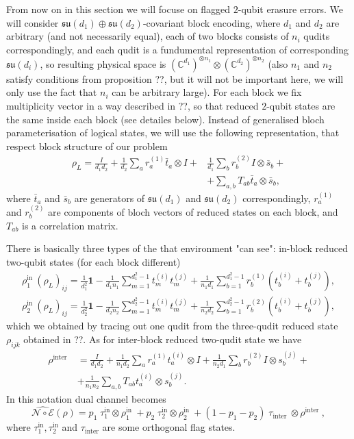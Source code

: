 \documentclass[twocolumn,superscriptaddress,aps,showpacs,amsmath,amstex,amssymb,citeautoscript,floatfix,pra,preprintnumbers]{revtex4-2}
\theoremstyle{plain}
\theoremstyle{plain}
\theoremstyle{plain}
\theoremstyle{plain}
\theoremstyle{plain}
\theoremstyle{plain}
\begin{document}
From now on in this section we will focuse on flagged $2$-qubit erasure errors. We will consider $\mathfrak{su}(d_1)\oplus\mathfrak{su}(d_2)$-covariant
block encoding, where $d_1$ and $d_2$ are arbitrary (and not necessarily equal), each of two blocks consists of $n_i$ qudits correspondingly, and
each qudit is a fundumental representation of corresponding $\mathfrak{su}(d_i)$, so resulting physical space is $(\mathbb{C}^{d_1})^{\otimes n_1}\otimes (\mathbb{C}^{d_2})^{\otimes n_2}$ (also $n_1$ and $n_2$
satisfy conditions from proposition ??, but it will not be important here, we will only use the fact that $n_i$ can be arbitrary large). 
For each block we fix multiplicity vector in a way described in ??, so that reduced $2$-qubit states are the same inside each block (see detailes below).
Instead of generalised bloch parameterisation of logical states, we will use the following representation, that respect block structure of our problem
\[
\begin{aligned}
    \rho_L=\frac{I}{d_1 d_2}+\frac{1}{d_2} \sum_a r_a^{(1)} \bar{t}_a \otimes I+&\frac{1}{d_1} \sum_b r_b^{(2)} I \otimes \bar{s}_b+\\&+\sum_{a, b} T_{a b} \bar{t}_a \otimes \bar{s}_b,
\end{aligned}
\]
where $\bar{t}_a$ and $\bar{s}_b$ are generators of $\mathfrak{su}(d_1)$ and $\mathfrak{su}(d_2)$ correspondingly, $r_a^{(1)}$ and $r_b^{(2)}$ are components of bloch vectors of reduced states on each block, and $T_{a b}$ is a correlation matrix.

There is basically three types of the that environment "can see": in-block reduced two-qubit states (for each block different)
\[
\begin{aligned}
    \rho_{1}^{\text {in }}(\rho_L)_{ij}=\frac{1}{d_1^2} \mathbf{1}-\frac{1}{d_1 n_1} \sum_{m=1}^{d_1^2-1} t_m^{(i)} t_m^{(j)}+\frac{1}{n_1 d_1} \sum_{b=1}^{d_1^2-1} r_b^{(1)}\left(t_b^{(i)}+t_b^{(j)}\right),\\
    \rho_{2}^{\text {in }}(\rho_L)_{ij}=\frac{1}{d_2^2} \mathbf{1}-\frac{1}{d_2 n_2} \sum_{m=1}^{d_2^2-1} t_m^{(i)} t_m^{(j)}+\frac{1}{n_2 d_2} \sum_{b=1}^{d_2^2-1} r_b^{(2)}\left(t_b^{(i)}+t_b^{(j)}\right),
\end{aligned}
\]
which we obtained by tracing out one qudit from the three-qudit reduced state $\rho_{i j k}$ obtained in ??. As for inter-block reduced two-qudit state we have
\[
\begin{aligned}
    \rho^{\text {inter }}&=\frac{I}{d_1 d_2}+\frac{1}{n_1 d_2} \sum_a r_a^{(1)} t_a^{(i)} \otimes I+\frac{1}{n_2 d_1} \sum_b r_b^{(2)} I \otimes s_b^{(j)}+\\&+\frac{1}{n_1 n_2} \sum_{a, b} T_{a b} t_a^{(i)} \otimes s_b^{(j)}.    
\end{aligned}
\]
In this notation dual channel becomes
\[
    \widehat{\mathcal{N} \circ \mathcal{E}}(\rho)=p_1\;\tau^{\text {in}}_1\otimes \rho^{\text {in }}_1 + p_2\;\tau^{\text {in}}_2\otimes \rho^{\text {in }}_2 + (1-p_1-p_2)\;\tau_{\text {inter }} \otimes \rho^{\text {inter }},
\]
where $\tau^{\text{in}}_1, \tau^{\text{in}}_2$ and $\tau_{\text{inter}}$ are some orthogonal flag states.
\end{document}
